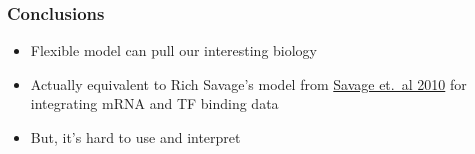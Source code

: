 \begin{frame}
	\frametitle{Conclusions}
	\begin{itemize}
		\item Flexible model can pull our interesting biology
		\item Actually equivalent to Rich Savage's model from \href{http://dx.doi.org/10.1093/bioinformatics/btq210}{Savage et.~al 2010} for integrating mRNA and \ac{TF} binding data
		\item But, it's hard to use and interpret
	\end{itemize}
\end{frame}